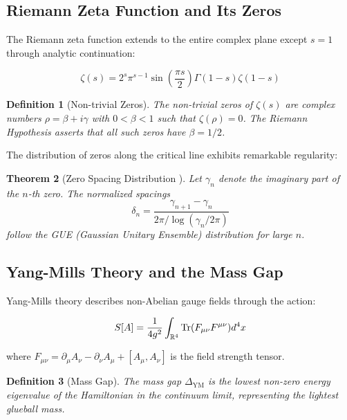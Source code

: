 \documentclass[12pt]{article}
\newtheorem{theorem}{Theorem}[section]
\newtheorem{definition}[theorem]{Definition}
\newcommand{\R}{\mathbb{R}}
\newcommand{\YM}{\text{YM}}
\begin{document}
\subsection{Riemann Zeta Function and Its Zeros}

The Riemann zeta function extends to the entire complex plane except $s = 1$ through analytic continuation:

\begin{equation}
\zeta(s) = 2^s \pi^{s-1} \sin\left(\frac{\pi s}{2}\right) \Gamma(1-s) \zeta(1-s)
\end{equation}

\begin{definition}[Non-trivial Zeros]
The non-trivial zeros of $\zeta(s)$ are complex numbers $\rho = \beta + i\gamma$ with $0 < \beta < 1$ such that $\zeta(\rho) = 0$. The Riemann Hypothesis asserts that all such zeros have $\beta = 1/2$.
\end{definition}

The distribution of zeros along the critical line exhibits remarkable regularity:

\begin{theorem}[Zero Spacing Distribution \cite{montgomery1973}]
Let $\gamma_n$ denote the imaginary part of the $n$-th zero. The normalized spacings
\begin{equation}
\delta_n = \frac{\gamma_{n+1} - \gamma_n}{2\pi/\log(\gamma_n/2\pi)}
\end{equation}
follow the GUE (Gaussian Unitary Ensemble) distribution for large $n$.
\end{theorem}

\subsection{Yang-Mills Theory and the Mass Gap}

Yang-Mills theory describes non-Abelian gauge fields through the action:

\begin{equation}
S[A] = \frac{1}{4g^2} \int_{\R^4} \Tr(F_{\mu\nu} F^{\mu\nu}) d^4x
\end{equation}

where $F_{\mu\nu} = \partial_\mu A_\nu - \partial_\nu A_\mu + [A_\mu, A_\nu]$ is the field strength tensor.

\begin{definition}[Mass Gap]
The mass gap $\Delta_{\YM}$ is the lowest non-zero energy eigenvalue of the Hamiltonian in the continuum limit, representing the lightest glueball mass.
\end{definition}
\end{document}
